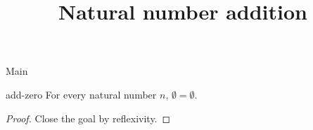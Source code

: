 \begin{lexlean}{Main}
\title{Natural number addition}

\begin{theorem}{add-zero}
\noaxioms
For every natural number \(n\), \(∅ = ∅\).
\begin{proof}
Close the goal by reflexivity.
\end{proof}
\end{theorem}
\end{lexlean}
